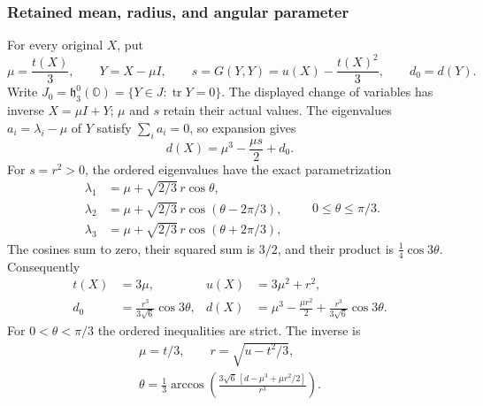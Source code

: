 \subsubsection{Retained mean, radius, and angular parameter}
\label{h24:ocb:sec:mean-radius-angle}

For every original $X$, put
\begin{equation}
 \mu=\frac{t(X)}3,\qquad Y=X-\mu I,\qquad
 s=G(Y,Y)=u(X)-\frac{t(X)^2}3,\qquad d_0=d(Y).
 \label{h24:ocb:eq:mean-radius}\tag{OCB12}
\end{equation}
Write $J_0=\mathfrak h_3^0(\mathbb O)=\{Y\in J:\operatorname{tr}Y=0\}$.
The displayed change of variables has inverse $X=\mu I+Y$;
$\mu$ and $s$ retain their actual values. The eigenvalues
$a_i=\lambda_i-\mu$ of $Y$ satisfy $\sum_i a_i=0$, so expansion gives
\begin{equation}
 d(X)=\mu^3-\frac{\mu s}{2}+d_0.
 \label{h24:ocb:eq:mean-determinant}\tag{OCB13}
\end{equation}
For $s=r^2>0$, the ordered eigenvalues have the exact parametrization
\begin{equation}
 \begin{aligned}
 \lambda_1&=\mu+\sqrt{2/3}\,r\cos\theta,\\
 \lambda_2&=\mu+\sqrt{2/3}\,r\cos(\theta-2\pi/3),\\
 \lambda_3&=\mu+\sqrt{2/3}\,r\cos(\theta+2\pi/3),
 \end{aligned}
 \qquad 0\le\theta\le\pi/3.
 \label{h24:ocb:eq:angular-eigenvalues}\tag{OCB14}
\end{equation}
The cosines sum to zero, their squared sum is $3/2$, and their
product is $\tfrac14\cos3\theta$. Consequently
\begin{equation}
 \begin{aligned}
 t(X)&=3\mu,&u(X)&=3\mu^2+r^2,\\
 d_0&=\frac{r^3}{3\sqrt6}\cos3\theta,&
 d(X)&=\mu^3-\frac{\mu r^2}{2}
                    +\frac{r^3}{3\sqrt6}\cos3\theta.
 \end{aligned}
 \label{h24:ocb:eq:angular-invariants}\tag{OCB15}
\end{equation}
For $0<\theta<\pi/3$ the ordered inequalities are strict. The inverse is
\begin{equation}
 \begin{gathered}
 \mu=t/3,\qquad r=\sqrt{u-t^2/3},\\
 \theta=\tfrac13\arccos\left(
 \frac{3\sqrt6\,[d-\mu^3+\mu r^2/2]}{r^3}\right).
 \end{gathered}
 \label{h24:ocb:eq:angular-inverse}\tag{OCB16}
\end{equation}
